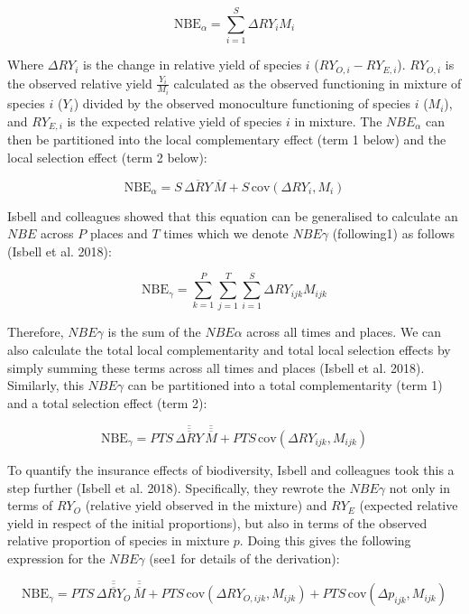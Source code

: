 \documentclass[
  letterpaper,
  DIV=11,
  numbers=noendperiod]{scrartcl}
\begin{document}
\[
\mathrm{NBE}_{\alpha} = \sum_{i=1}^{S} \Delta RY_i M_i \tag{Equation S1}
\]

Where \(\Delta RY_{i}\) is the change in relative yield of species \(i\)
(\(RY_{O,i} - RY_{E,i}\)). \(RY_{O,i}\) is the observed relative yield
\(\frac{Y_i}{M_i}\) calculated as the observed functioning in mixture of
species \(i\) (\(Y_i\)) divided by the observed monoculture functioning
of species \(i\) (\(M_i\)), and \(RY_{E, i}\) is the expected relative
yield of species \(i\) in mixture. The \(NBE_{\alpha}\) can then be
partitioned into the local complementary effect (term 1 below) and the
local selection effect (term 2 below):

\[
\mathrm{NBE}_{\alpha} = S \, \overline{\Delta RY} \, \overline{M} + S \, \mathrm{cov}(\Delta RY_i, M_i) \tag{Equation S2}
\]

Isbell and colleagues showed that this equation can be generalised to
calculate an \(NBE\) across \(P\) places and \(T\) times which we denote
\(NBE \gamma\) (following1) as follows (Isbell et al. 2018):

\[
\mathrm{NBE}_{\gamma} = \sum_{k=1}^{P} \sum_{j=1}^{T} \sum_{i=1}^{S} \Delta RY_{ijk} M_{ijk} \tag{Equation S3}
\]

Therefore, \(NBE \gamma\) is the sum of the \(NBE \alpha\) across all
times and places. We can also calculate the total local complementarity
and total local selection effects by simply summing these terms across
all times and places (Isbell et al. 2018). Similarly, this
\(NBE \gamma\) can be partitioned into a total complementarity (term 1)
and a total selection effect (term 2):

\[
\mathrm{NBE}_{\gamma} = PTS \, \overline{\overline{\overline{\Delta RY}}} \, \overline{\overline{\overline{M}}} + PTS \, \mathrm{cov}(\Delta RY_{ijk}, M_{ijk}) \tag{Equation S4}
\]

To quantify the insurance effects of biodiversity, Isbell and colleagues
took this a step further (Isbell et al. 2018). Specifically, they
rewrote the \(NBE \gamma\) not only in terms of \(RY_O\) (relative yield
observed in the mixture) and \(RY_E\) (expected relative yield in
respect of the initial proportions), but also in terms of the observed
relative proportion of species in mixture \(p\). Doing this gives the
following expression for the \(NBE \gamma\) (see1 for details of the
derivation):

\[
\mathrm{NBE}_{\gamma} = PTS \, \overline{\overline{\overline{\Delta RY_{O}}}} \, \overline{\overline{\overline{M}}} + PTS \, \mathrm{cov}(\Delta RY_{O,ijk}, M_{ijk}) + PTS \, \mathrm{cov}(\Delta p_{ijk}, M_{ijk}) \tag{Equation S5}
\]
\end{document}

